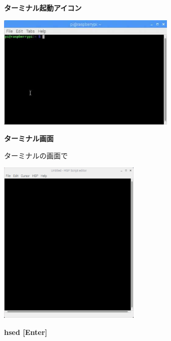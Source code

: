 \documentclass[a4paper,dvipdfmx]{jarticle}
\newcommand\textstyleqwerty[1]{#1}
\begin{document}
\bigskip

\textstyleqwerty{\textbf{ターミナル起動アイコン}}


\bigskip


\bigskip



\begin{center}
\includegraphics[width=8.52cm,height=5.45cm]{text02-img/text02-img004.png}

\end{center}

\bigskip


\bigskip


\bigskip


\bigskip


\bigskip


\bigskip


\bigskip


\bigskip


\bigskip

\textstyleqwerty{\textbf{ターミナル画面}}


\bigskip


\bigskip


\bigskip

ターミナルの画面で



\begin{center}
\includegraphics[width=6.786cm,height=7.853cm]{text02-img/text02-img010.png}

\end{center}
{\bfseries
hsed [Enter]}
\end{document}
